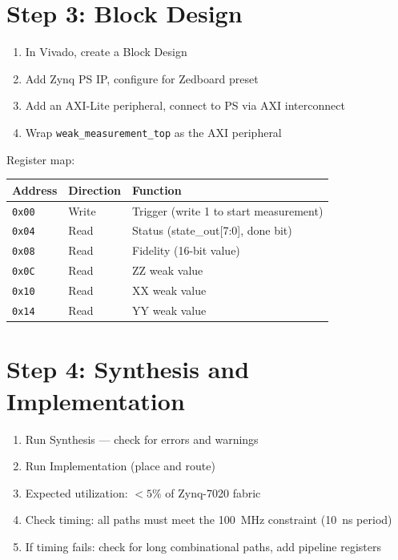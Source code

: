 \documentclass[11pt,a4paper,openany]{book}
\begin{document}
\section{Step 3: Block Design}

\begin{enumerate}[nosep]
  \item In Vivado, create a Block Design
  \item Add Zynq PS IP, configure for Zedboard preset
  \item Add an AXI-Lite peripheral, connect to PS via AXI interconnect
  \item Wrap \texttt{weak\_measurement\_top} as the AXI peripheral
\end{enumerate}

\noindent
Register map:

\begin{center}
\begin{tabular}{lll}
\toprule
\textbf{Address} & \textbf{Direction} & \textbf{Function} \\
\midrule
\texttt{0x00} & Write & Trigger (write 1 to start measurement) \\
\texttt{0x04} & Read & Status (state\_out[7:0], done bit) \\
\texttt{0x08} & Read & Fidelity (16-bit value) \\
\texttt{0x0C} & Read & ZZ weak value \\
\texttt{0x10} & Read & XX weak value \\
\texttt{0x14} & Read & YY weak value \\
\bottomrule
\end{tabular}
\end{center}

\section{Step 4: Synthesis and Implementation}

\begin{enumerate}[nosep]
  \item Run Synthesis --- check for errors and warnings
  \item Run Implementation (place and route)
  \item Expected utilization: $< 5\%$ of Zynq-7020 fabric
  \item Check timing: all paths must meet the 100~MHz constraint (10~ns period)
  \item If timing fails: check for long combinational paths, add pipeline registers
\end{enumerate}
\end{document}
